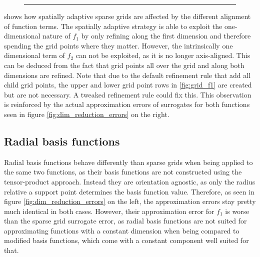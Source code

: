 \documentclass[
  a4paper,  %
  twoside,  %
  bibliography=totoc,
  headsepline,
  cleardoublepage=empty,
  parskip=half,
  draft=false
]{scrbook}
\newcommand{\delimit}{{\color{silver}\noindent\rule{\textwidth}{1pt}}}
\begin{document}
\begin{mdframed}[style=style]
\begin{figure}[H]
\begin{subfigure}{.5\textwidth}
  \label{fig:grid_f2}
\end{subfigure}
\vspace{2.5mm}
\delimit
{}
\label{fig:grids}
\end{figure}
\end{mdframed}

 shows how spatially adaptive sparse grids are affected by the different alignment of function terms.
The spatially adaptive strategy is able to exploit the one-dimensional nature of $f_1$ by only refining along the first dimension and therefore spending the grid points where they matter.
However, the intrinsically one dimensional term of $f_2$ can not be exploited, as it is no longer axis-aligned.
This can be deduced from the fact that grid points all over the grid and along both dimensions are refined.
Note that due to the default refinement rule that add all child grid points, the upper and lower grid point rows in \cref{fig:grid_f1} are created but are not necessary.
A tweaked refinement rule could fix this.
This observation is reinforced by the actual approximation errors of surrogates for both functions seen in figure \cref{fig:dim_reduction_errors} on the right.

\subsection{Radial basis functions}

Radial basis functions behave differently than sparse grids when being applied to the same two functions, as their basis functions are not constructed using the tensor-product approach.
Instead they are orientation agnostic, as only the radius relative a support point determines the basis function value.
Therefore, as seen in figure \cref{fig:dim_reduction_errors} on the left, the approximation errors stay pretty much identical in both cases.
However, their approximation error for $f_1$ is worse than the sparse grid surrogate error, as radial basis functions are not suited for approximating functions with a constant dimension when being compared to modified basis functions, which come with a constant component well suited for that.
\end{document}
